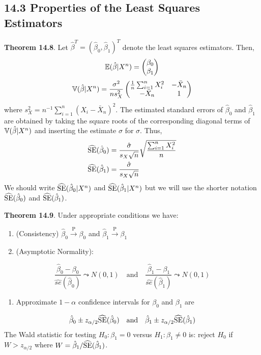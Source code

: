 \subsection*{14.3 Properties of the Least Squares
Estimators}\label{properties-of-the-least-squares-estimators}

\textbf{Theorem 14.8}. Let
\(\hat{\beta}^T = (\hat{\beta}_{0}, \hat{\beta}_{1})^T\) denote the least
squares estimators. Then,
\[
\operatorname{\mathbb{E}}(\hat{\beta} | X^{n}) = \begin{pmatrix}\beta_{0} \\ \beta_{1} \end{pmatrix}
\]
\[
\operatorname{\mathbb{V}}(\hat{\beta} | X^{n}) = \frac{\sigma^{2}}{n s_X^{2}} \begin{pmatrix} 
\frac{1}{n} \sum_{i=1}^{n} X_{i}^{2} & -\bar{X}_{n} \\
-\bar{X}_{n} & 1
\end{pmatrix}
\]
where \(s_X^{2} = n^{-1} \sum_{i=1}^{n} (X_{i} - \bar{X}_{n})^{2}\).
The estimated standard errors of \(\hat{\beta}_{0}\) and \(\hat{\beta}_{1}\)
are obtained by taking the square roots of the corresponding diagonal
terms of \(\operatorname{\mathbb{V}}(\hat{\beta} | X^{n})\) and inserting the estimate
\(\hat{\sigma}\) for \(\sigma\). Thus,
\begin{align*}
\widehat{\operatorname{\mathrm{SE}}}(\hat{\beta}_{0}) &= \frac{\hat{\sigma}}{s_X \sqrt{n}} \sqrt{\frac{\sum_{i=1}^{n} X_{i}^{2}}{n}}\\
\widehat{\operatorname{\mathrm{SE}}}(\hat{\beta}_{1}) &= \frac{\hat{\sigma}}{s_X \sqrt{n}}
\end{align*}
We should write \(\widehat{\operatorname{\mathrm{SE}}}(\hat{\beta}_{0} | X^{n})\) and
\(\widehat{\operatorname{\mathrm{SE}}}(\hat{\beta}_{1} | X^{n})\) but we will use the shorter
notation \(\widehat{\operatorname{\mathrm{SE}}}(\hat{\beta}_{0})\) and
\(\widehat{\operatorname{\mathrm{SE}}}(\hat{\beta}_{1})\).

\textbf{Theorem 14.9}. Under appropriate conditions we have:
\begin{enumerate}[label={\arabic*.}]
\item
  (Consistency) \(\hat{\beta}_{0} \xrightarrow{\textrm{P}} \beta_{0}\) and
  \(\hat{\beta}_{1} \xrightarrow{\textrm{P}} \beta_{1}\)
\item
  (Asymptotic Normality):
\end{enumerate}
\[
\frac{\hat{\beta}_{0} - \beta_{0}}{\hat{se}(\hat{\beta}_{0})} \leadsto N(0, 1)
\quad \text{and} \quad
\frac{\hat{\beta}_{1} - \beta_{1}}{\hat{se}(\hat{\beta}_{1})} \leadsto N(0, 1)
\]
\begin{enumerate}[tightlist,label={\arabic*.},resume]
\item
  Approximate \(1 - \alpha\) confidence intervals for \(\beta_{0}\) and
  \(\beta_{1}\) are
\end{enumerate}
\[
\hat{\beta}_{0} \pm z_{\alpha/2} \widehat{\operatorname{\mathrm{SE}}}(\hat{\beta}_{0})
\quad \text{and} \quad
\hat{\beta}_{1} \pm z_{\alpha/2} \widehat{\operatorname{\mathrm{SE}}}(\hat{\beta}_{1})
\]
The Wald statistic for testing \(H_{0} : \beta_{1} = 0\) versus
\(H_{1}: \beta_{1} \neq 0\) is: reject \(H_{0}\) if \(W > z_{\alpha / 2}\)
where \(W = \hat{\beta}_{1} / \widehat{\operatorname{\mathrm{SE}}}(\hat{\beta}_{1})\).

